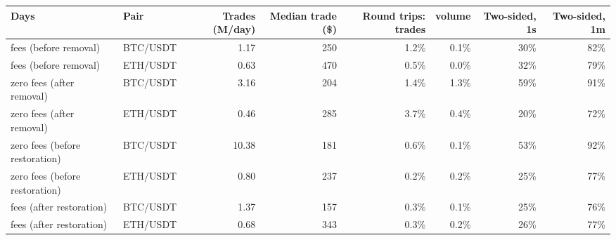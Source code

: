 \begin{tabular}{llrrrrrr}
\toprule
Days & Pair & Trades (M/day) & Median trade (\$) & Round trips: trades & volume & Two-sided, 1s & Two-sided, 1m\\
\midrule
fees (before removal) & BTC/USDT & 1.17 & 250 & 1.2\% & 0.1\% & 30\% & 82\%\\
fees (before removal) & ETH/USDT & 0.63 & 470 & 0.5\% & 0.0\% & 32\% & 79\%\\
zero fees (after removal) & BTC/USDT & 3.16 & 204 & 1.4\% & 1.3\% & 59\% & 91\%\\
zero fees (after removal) & ETH/USDT & 0.46 & 285 & 3.7\% & 0.4\% & 20\% & 72\%\\
zero fees (before restoration) & BTC/USDT & 10.38 & 181 & 0.6\% & 0.1\% & 53\% & 92\%\\
zero fees (before restoration) & ETH/USDT & 0.80 & 237 & 0.2\% & 0.2\% & 25\% & 77\%\\
fees (after restoration) & BTC/USDT & 1.37 & 157 & 0.3\% & 0.1\% & 25\% & 76\%\\
fees (after restoration) & ETH/USDT & 0.68 & 343 & 0.3\% & 0.2\% & 26\% & 77\%\\
\bottomrule
\end{tabular}
